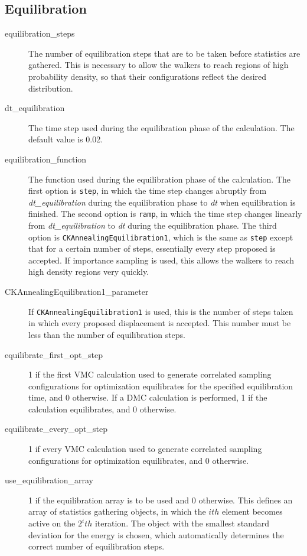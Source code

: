 \documentclass[11pt]{article}
\begin{document}
\subsection{Equilibration}

\begin{description}

\item [equilibration\_steps]  The number of equilibration steps that are
  to be taken before statistics are gathered.  This is necessary to
  allow the walkers to reach regions of high probability density, so
  that their configurations reflect the desired distribution.  

\item [dt\_equilibration]  The time step used during the equilibration
  phase of the calculation.  The default value is 0.02.  

\item [equilibration\_function]  The function used during the
  equilibration phase of the calculation.  The first option is 
  \verb-step-, in which the time step changes abruptly from
  \emph{dt\_equilibration} during the equilibration phase to \emph{dt}
  when equilibration is finished.  The second option is \verb-ramp-,
  in which the time step changes linearly from \emph{dt\_equilibration}
  to \emph{dt} during the equilibration phase.  The third option is
  \verb-CKAnnealingEquilibration1-, which is the same as \verb-step-
  except that for a certain number of steps, essentially every step
  proposed is accepted.  If importance sampling is used, this allows
  the walkers to reach high density regions very quickly.

\item [CKAnnealingEquilibration1\_parameter]  If
  \verb-CKAnnealingEquilibration1- is used, this is the number of
  steps taken in which every proposed displacement is accepted.  This
  number must be less than the number of equilibration steps.  
 
\item [equilibrate\_first\_opt\_step] 1 if the first VMC calculation used
  to generate correlated sampling configurations for optimization
  equilibrates for the specified equilibration time, and 0 otherwise.
  If a DMC calculation is performed, 1 if the calculation
  equilibrates, and 0 otherwise.   

\item [equilibrate\_every\_opt\_step] 1 if every VMC calculation used to
  generate correlated sampling configurations for optimization
  equilibrates, and 0 otherwise.  

\item [use\_equilibration\_array] 1 if the equilibration array is to be
  used and 0 otherwise.  This defines an array of statistics gathering
  objects, in which the $ith$ element becomes active on the $2^{i}th$
  iteration.  The object with the smallest standard deviation for the
  energy is chosen, which automatically determines the correct number
  of equilibration steps.  

\end{description}
\end{document}
